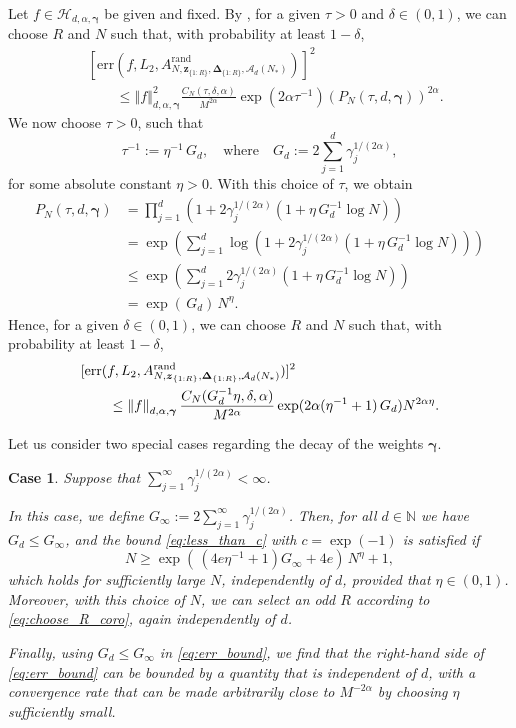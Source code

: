 \documentclass[pdflatex,sn-basic,Numbered]{sn-jnl}%
\newcommand{\rand}{\mathrm{rand}}
\newcommand{\bsz}{\boldsymbol{z}}
\newcommand{\bsgamma}{\boldsymbol{\gamma}}
\newcommand{\bsDelta}{\boldsymbol{\Delta}}
\newcommand{\NN}{\mathbb{N}}
\newcommand{\Acal}{\mathcal{A}}
\newcommand{\Hcal}{\mathcal{H}}
\newcommand{\norm}[1]{\left\Vert#1\right\Vert}
\theoremstyle{thmstyleone}%
\theoremstyle{thmstyletwo}%
\newtheorem{case}{Case}
\begin{document}
Let $f\in\Hcal_{d,\alpha,\bsgamma}$ be given and fixed.
By , for a given $\tau > 0$ and $\delta \in (0,1)$, we can choose $R$ and $N$ such that, with probability at least $1 - \delta$,
\begin{align*}
& [\mathrm{err}(f, L_2, A^{\rand}_{N,\bsz_{\{1{:}R\}},\bsDelta_{\{1{:}R\}},\Acal_d(N_*)})]^2 \\
&\qquad \le \norm{f}_{d,\alpha,\bsgamma}^2
\frac{C_N(\tau,\delta,\alpha) }{M^{2\alpha}} 
    \exp(2\alpha\tau^{-1})
    (P_N (\tau,d,\bsgamma))^{2\alpha} .
\end{align*}
We now choose $\tau>0$, such that
\[
  \tau^{-1}:=\eta^{-1}\, G_d,\quad \mbox{where}\quad G_d:= 2\sum_{j=1}^d \gamma_j^{1/(2\alpha)},
\]
for some absolute constant $\eta>0$. With this choice of $\tau$, we obtain
\begin{align*}
P_N (\tau,d,\bsgamma) &= 
\prod_{j=1}^d \left(1+ 2\gamma_j^{1/(2\alpha)} (1+\eta\,G_d^{-1}\log N)\right)\\
&= 
   \exp \left(\sum_{j=1}^d \log \left(1+ 2\gamma_j^{1/(2\alpha)} (1+\eta\,G_d^{-1}\log N)\right)\right)\\
&\le 
   \exp \left(\sum_{j=1}^d 2\gamma_j^{1/(2\alpha)} (1+\eta\,G_d^{-1}\log N)\right)\\
&= \exp(\, G_d) \, N^\eta.
\end{align*}
Hence, for a given $\delta \in (0,1)$, we can choose $R$ and $N$ such that, with probability at least $1 - \delta$,
\begin{align}\label{eq:err_bound}
       & [\mathrm{err}(f, L_2, A^{\rand}_{N,\bsz_{\{1{:}R\}},\bsDelta_{\{1{:}R\}},\Acal_d(N_*)})]^2 \notag \\
& \qquad \le \norm{f}_{d,\alpha,\bsgamma} \frac{C_N( G^{-1}_d \eta ,\delta,\alpha) }{M^{2\alpha}} \exp(2\alpha(\eta^{-1}+1)\, G_d)  N^{2\alpha\eta}. 
\end{align}

Let us consider two special cases regarding the decay of the weights $\bsgamma$.

\begin{case}
Suppose that $\sum_{j=1}^\infty \gamma_j^{1/(2\alpha)} < \infty$. 

In this case, we define $G_\infty:=2\sum_{j=1}^\infty \gamma_j^{1/(2\alpha)}$. Then, for all $d \in \NN$ we have $G_d \le G_\infty$, and the bound \eqref{eq:less_than_c} with $c = \exp(-1)$ is satisfied if
\[
 N \ge \exp\left(\, (4e\eta^{-1}+1)G_\infty+4e\right) \, N^\eta +1,
\]
which holds for sufficiently large $N$, independently of $d$, provided that $\eta \in (0,1)$. Moreover, with this choice of $N$, we can select an odd $R$ according to \eqref{eq:choose_R_coro}, again independently of $d$.

Finally, using $G_d \le G_\infty$ in \eqref{eq:err_bound}, we find that the right-hand side of \eqref{eq:err_bound} can be bounded by a quantity that is independent of $d$, with a convergence rate that can be made arbitrarily close to $M^{-2\alpha}$ by choosing $\eta$ sufficiently small.
\end{case}
\end{document}
